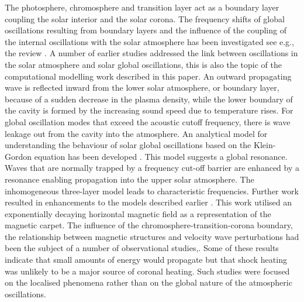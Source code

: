 \documentclass[physics,article,submit,pdftex,moreauthors]{Definitions/mdpi}
\begin{document}
 The photosphere, chromosphere and transition layer act as a boundary layer coupling the solar interior and the solar corona. The frequency shifts of global oscillations resulting  from boundary layers   and the influence of the coupling of the internal oscillations with the solar atmosphere has been investigated see e.g., the review \cite{Erdelyi2006}.  A number of earlier studies addressed the link between oscillations in the solar atmosphere and solar global oscillations,  this is also the topic of the computational modelling work described in this paper. An outward propagating wave is reflected inward from the lower solar atmosphere, or boundary layer, because of a sudden decrease in the plasma density, while the lower boundary of the cavity is formed by the increasing sound speed due to temperature rises. For global oscillation modes that exceed the acoustic cutoff frequency, there is wave leakage out from the cavity into the atmosphere. An analytical model for understanding the behaviour of solar global oscillations based on the Klein-Gordon equation has been  developed \cite{Taroyan2008}. This model suggests a global resonance. Waves  that are normally trapped by a frequency cut-off barrier are enhanced by a resonance enabling propagation into the upper solar atmosphere. The inhomogeneous three-layer model leads to characteristic frequencies. Further work resulted in enhancements to the models described earlier \cite{Pinter2007}.  This work utilised an exponentially decaying horizontal magnetic field as a representation of the magnetic carpet.  The influence of the chromosphere-transition-corona boundary, the relationship between magnetic structures and velocity wave perturbations had been the subject of a number of observational studies\cite{Mein1976},\cite{Schmieder1980}. Some of these results indicate that small amounts of energy would propagate but that shock heating was unlikely to be a major source of coronal heating. Such studies were focused on the localised phenomena rather than on the global nature of the atmospheric oscillations.
 
\end{document}
